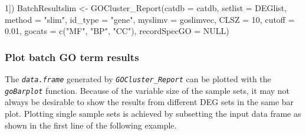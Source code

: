 \documentclass[14pt,]{article}
\newcommand{\hlnum}[1]{\textcolor[rgb]{0.816,0.125,0.439}{#1}}%
\newcommand{\hlstr}[1]{\textcolor[rgb]{0.251,0.627,0.251}{#1}}%
\newcommand{\hlopt}[1]{\textcolor[rgb]{0,0,0}{#1}}%
\newcommand{\hlstd}[1]{\textcolor[rgb]{0.251,0.251,0.251}{#1}}%
\newcommand{\hlkwc}[1]{\textcolor[rgb]{0.251,0.251,0.251}{#1}}%
\newcommand{\hlkwd}[1]{\textcolor[rgb]{0.878,0.439,0.125}{#1}}%
\newenvironment{Shaded}{\begin{myshaded}}{\end{myshaded}}
\newcommand{\KeywordTok}[1]{\hlkwd{#1}}
\newcommand{\DataTypeTok}[1]{\hlkwc{#1}}
\newcommand{\DecValTok}[1]{\hlnum{#1}}
\newcommand{\FloatTok}[1]{\hlnum{#1}}
\newcommand{\StringTok}[1]{\hlstr{#1}}
\newcommand{\OtherTok}[1]{{#1}}
\newcommand{\OperatorTok}[1]{\hlopt{#1}}
\newcommand{\NormalTok}[1]{\hlstd{#1}}
\begin{document}
\begin{Shaded}
\begin{Highlighting}[]
    \DecValTok{1}\NormalTok{])}
\NormalTok{BatchResultslim <-}\StringTok{ }\KeywordTok{GOCluster_Report}\NormalTok{(}\DataTypeTok{catdb =}\NormalTok{ catdb, }\DataTypeTok{setlist =}\NormalTok{ DEGlist, }\DataTypeTok{method =} \StringTok{"slim"}\NormalTok{, }
    \DataTypeTok{id_type =} \StringTok{"gene"}\NormalTok{, }\DataTypeTok{myslimv =}\NormalTok{ goslimvec, }\DataTypeTok{CLSZ =} \DecValTok{10}\NormalTok{, }\DataTypeTok{cutoff =} \FloatTok{0.01}\NormalTok{, }\DataTypeTok{gocats =} \KeywordTok{c}\NormalTok{(}\StringTok{"MF"}\NormalTok{, }
        \StringTok{"BP"}\NormalTok{, }\StringTok{"CC"}\NormalTok{), }\DataTypeTok{recordSpecGO =} \OtherTok{NULL}\NormalTok{)}
\end{Highlighting}
\end{Shaded}

\hypertarget{plot-batch-go-term-results}{%
\subsubsection{Plot batch GO term results}\label{plot-batch-go-term-results}}

The \emph{\texttt{data.frame}} generated by \emph{\texttt{GOCluster\_Report}} can be plotted with the \emph{\texttt{goBarplot}} function. Because of the variable size of the sample sets, it may not always be desirable to show the results from different DEG sets in the same bar plot. Plotting single sample sets is achieved by subsetting the input data frame as shown in the first line of the following example.

\begin{Shaded}
\end{Shaded}
\end{document}
